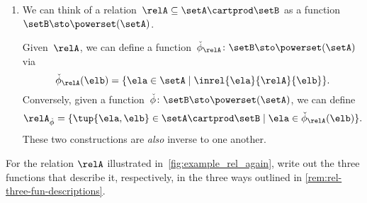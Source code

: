\begin{enumerate}
        \item We can think of a relation~$\relA \subseteq \setA \cartprod \setB$ as a function~$\setB  \sto \powerset (\setA)$.

              Given~$\relA$, we can define a function~$\check \phi_{\relA} \colon \setB \sto \powerset (\setA)$ via
              \begin{equation}
                  \check \phi_{\relA} (\elb) = \{ \ela \in \setA \mid \inrel{\ela}{\relA}{\elb}\}.
              \end{equation}
              Conversely, given a function~$\check \phi \colon \setB \sto \powerset (\setA)$, we can define
              \begin{equation}
                  \relA_{\check \phi} = \{ \tup{\ela, \elb} \in \setA \cartprod \setB \mid \ela \in \check \phi_{\relA}(\elb)\}.
              \end{equation}
              These two constructions are \emph{also} inverse to one another.
    \end{enumerate}

\begin{marginfigure}
    \centering
    \caption{}
    \label{fig:example_rel_again}
\end{marginfigure}
\vfill
\begin{gradedexercise}
    \label{ex:Rel3Functions}
    For the relation $\relA$ illustrated in~\cref{fig:example_rel_again}, write out the three functions that describe it, respectively, in the three ways outlined in \cref{rem:rel-three-fun-descriptions}.
\end{gradedexercise}

